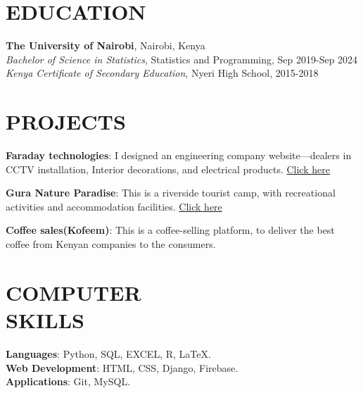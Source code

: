 \documentclass[margin]{res}
\begin{document}
\begin{resume}

\section{EDUCATION}
\textbf{The University of Nairobi}, Nairobi, Kenya\\
{\sl Bachelor of Science in Statistics}, Statistics and Programming, Sep 2019-Sep 2024
\\
{\sl Kenya Certificate of Secondary Education}, Nyeri High School, 2015-2018

\section{PROJECTS}
\par
\textbf{Faraday technologies}: 
I designed an engineering company website—dealers in CCTV installation, Interior decorations, and electrical products. \href{www.faradaytechnologies.co.ke}{Click here}


\par
\textbf{Gura Nature Paradise}:
This is a riverside tourist camp, with recreational activities and accommodation facilities.
\href{www.guranatureparadise.com}{Click here}
\par
\textbf{Coffee sales(Kofeem)}: 
This is a coffee-selling platform, to deliver the best coffee from Kenyan companies to the consumers.



\section{COMPUTER\\SKILLS}

\textbf{Languages}: Python, SQL, EXCEL, R, \LaTeX.
\\
\textbf{Web Development}: HTML, CSS, Django, Firebase.
\\
\textbf{Applications}: Git, MySQL.
\\


\end{resume}
\end{document}
